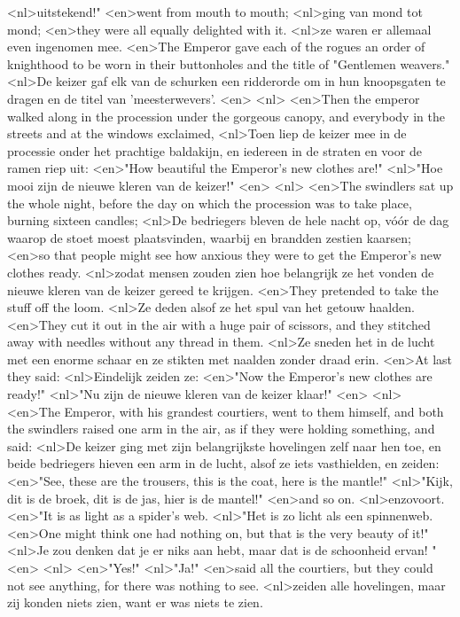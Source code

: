 <nl>uitstekend!"
<en>went from mouth to mouth;
<nl>ging van mond tot mond;
<en>they were all equally delighted with it.
<nl>ze waren er allemaal even ingenomen mee.
<en>The Emperor gave each of the rogues an order of knighthood to be worn in their buttonholes and the title of "Gentlemen weavers."
<nl>De keizer gaf elk van de schurken een ridderorde om in hun knoopsgaten te dragen en de titel van 'meesterwevers'.
<en>
<nl>
<en>Then the emperor walked along in the procession under the gorgeous canopy, and everybody in the streets and at the windows exclaimed,
<nl>Toen liep de keizer mee in de processie onder het prachtige baldakijn, en iedereen in de straten en voor de ramen riep uit:
<en>"How beautiful the Emperor's new clothes are!"
<nl>"Hoe mooi zijn de nieuwe kleren van de keizer!"
<en>
<nl>
<en>The swindlers sat up the whole night, before the day on which the procession was to take place, burning sixteen candles;
<nl>De bedriegers bleven de hele nacht op, vóór de dag waarop de stoet moest plaatsvinden, waarbij en brandden zestien kaarsen;
<en>so that people might see how anxious they were to get the Emperor's new clothes ready.
<nl>zodat mensen zouden zien hoe belangrijk ze het vonden de nieuwe kleren van de keizer gereed te krijgen.
<en>They pretended to take the stuff off the loom.
<nl>Ze deden alsof ze het spul van het getouw haalden.
<en>They cut it out in the air with a huge pair of scissors, and they stitched away with needles without any thread in them.
<nl>Ze sneden het in de lucht met een enorme schaar en ze stikten met naalden zonder draad erin.
<en>At last they said:
<nl>Eindelijk zeiden ze:
<en>"Now the Emperor's new clothes are ready!"
<nl>"Nu zijn de nieuwe kleren van de keizer klaar!"
<en>
<nl>
<en>The Emperor, with his grandest courtiers, went to them himself, and both the swindlers raised one arm in the air, as if they were holding something, and said:
<nl>De keizer ging met zijn belangrijkste hovelingen zelf naar hen toe, en beide bedriegers hieven een arm in de lucht, alsof ze iets vasthielden, en zeiden:
<en>"See, these are the trousers, this is the coat, here is the mantle!"
<nl>"Kijk, dit is de broek, dit is de jas, hier is de mantel!"
<en>and so on.
<nl>enzovoort.
<en>"It is as light as a spider's web.
<nl>"Het is zo licht als een spinnenweb.
<en>One might think one had nothing on, but that is the very beauty of it!"
<nl>Je zou denken dat je er niks aan hebt, maar dat is de schoonheid ervan! "
<en>
<nl>
<en>"Yes!"
<nl>"Ja!"
<en>said all the courtiers, but they could not see anything, for there was nothing to see.
<nl>zeiden alle hovelingen, maar zij konden niets zien, want er was niets te zien.

